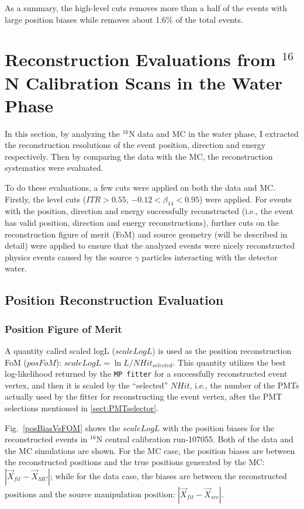 As a summary, the high-level cuts removes more than a half of the events with large position biases while removes about 1.6\% of the total events. 

\section{Reconstruction Evaluations from $^{16}$N Calibration Scans in the Water Phase}

In this section, by analyzing the $^{16}$N data and MC in the water phase, I extracted the reconstruction resolutions of the event position, direction and energy respectively. Then by comparing the data with the MC, the reconstruction systematics were evaluated.

To do these evaluations, a few cuts were applied on both the data and MC. Firstly, the level cuts  ($ITR>0.55$, $-0.12<\beta_{14}<0.95$) were applied. For events with the position, direction and energy successfully reconstructed (i.e., the event has valid position, direction and energy reconstructions), further cuts on the reconstruction figure of merit (FoM) and source geometry (will be described in detail) were applied to ensure that the analyzed events were nicely reconstructed physics events caused by the source $\gamma$ particles interacting with the detector water.

\subsection{Position Reconstruction Evaluation}
\subsubsection{Position Figure of Merit}
A quantity called scaled logL ($scaleLogL$) is used as the position reconstruction FoM ($posFoM$): $scaleLogL = \ln L/NHit_{selected}$. This quantity utilizes the best log-likelihood returned by the \texttt{MP fitter} for a successfully reconstructed event vertex, and then it is scaled by the ``selected'' $NHit$, i.e., the number of the PMTs actually used by the fitter for reconstructing the event vertex, after the PMT selections mentioned in \ref{sect:PMTselector}.

Fig.~\ref{posBiasVsFOM} shows the $scaleLogL$ with the position biases for the reconstructed events in $^{16}$N central calibration run-107055. Both of the data and the MC simulations are shown. For the MC case, the position biases are between the reconstructed positions and the true positions generated by the MC: $|\vec{X}_{fit}-\vec{X}_{MC}|$; while for the data case, the biases are between the reconstructed positions and the source manipulation position: $|\vec{X}_{fit}-\vec{X}_{src}|$.

